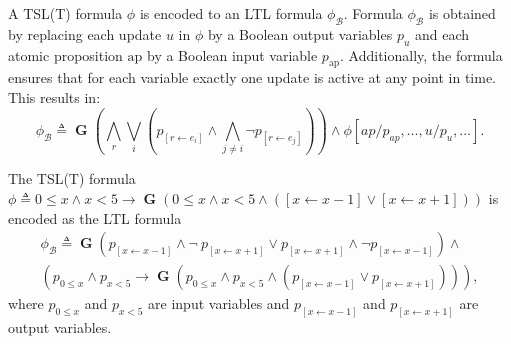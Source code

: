 \documentclass[runningheads]{llncs}
\newcommand{\ap}{\mathrm{ap}}
\newcommand{\globally}{\operatorname{\mathbf{G}}}
\newcommand{\theory}{\mathcal{T}}
\newcommand{\bool}{\mathcal{B}}
\newcommand{\updf}{\mathbf{u}}
\newcommand{\updfs}{\mathbf{U}}
\newcommand{\rvar}{\mathbf{r}}
\newcommand{\rvars}{\mathbf{R}}
\newcommand{\ivar}{\mathbf{i}}
\newcommand{\ivars}{\mathbf{I}}
\newcommand{\bexpr}{E_\theory^\mathbb{B}(R \cup I)}
\begin{document}

A TSL(T) formula $\phi$ is encoded to an LTL formula $\phi_\bool$. Formula $\phi_\bool$ is obtained by replacing each update $u$  in $\phi$ by a Boolean output variables $p_u$ and  each atomic proposition $\ap$ by a Boolean input variable $p_{\ap}$.
Additionally, the formula  ensures that for each variable exactly one update is active at any point in time.
This results in:
$$
\phi_\bool \triangleq \globally(\bigwedge_r \bigvee_i( p_{[r \leftarrow e_i]} \land \bigwedge_{j\neq i} \neg p_{[r \leftarrow e_j]})) \land \phi[ap / p_{ap}, \ldots, u / p_u, \ldots].
$$


\begin{example}
The TSL(T) formula $\phi \triangleq 0 \leq x \land x<5 \rightarrow \globally(0 \leq x \land x<5 \land ([x \leftarrow x-1] \lor [x \leftarrow x+1]))$ is encoded as the LTL formula 
\begin{multline*}
\phi_\bool \triangleq  \globally (p_{[x \leftarrow x-1]} \wedge \neg \ p_{[x \leftarrow x+1]} \vee p_{[x \leftarrow x+1]} \wedge \neg p_{[x \leftarrow x-1]}) \land\\
(p_{0 \leq x} \land p_{x<5} \rightarrow \globally(p_{0 \leq x} \land p_{x<5} \land (p_{[x \leftarrow x-1]} \lor p_{[x \leftarrow x+1]}))),
\end{multline*}
where $p_{0 \leq x}$ and $p_{x<5}$ are input variables and $p_{[x \leftarrow x-1]}$ and $p_{[x \leftarrow x+1]}$ are output variables.
\end{example}
\end{document}
